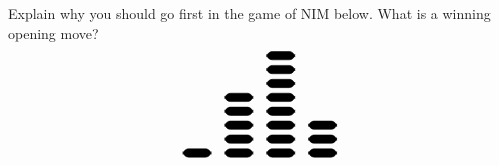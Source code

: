 \documentclass[12pt,letterpaper]{exam}
\begin{document}
\begin{questions}
\newpage
\question[10] Explain why you should go first in the game of NIM below. What is a winning opening move?
	\[
	\begin{tikzpicture}[scale=0.7]
	\draw[rounded corners,fill=black] (0,0) rectangle (1,0.3);
	\draw[rounded corners,fill=black] (1.5,0) rectangle (2.5,0.3);
	\draw[rounded corners,fill=black] (1.5,0.5) rectangle (2.5,0.8);
	\draw[rounded corners,fill=black] (1.5,1) rectangle (2.5,1.3);
	\draw[rounded corners,fill=black] (1.5,1.5) rectangle (2.5,1.8);
	\draw[rounded corners,fill=black] (1.5,2) rectangle (2.5,2.3);
	\draw[rounded corners,fill=black] (3,0) rectangle (4,0.3);
	\draw[rounded corners,fill=black] (3,0.5) rectangle (4,0.8);
	\draw[rounded corners,fill=black] (3,1) rectangle (4,1.3);	
	\draw[rounded corners,fill=black] (3,1.5) rectangle (4,1.8);	
	\draw[rounded corners,fill=black] (3,2) rectangle (4,2.3);	
	\draw[rounded corners,fill=black] (3,2.5) rectangle (4,2.8);	
	\draw[rounded corners,fill=black] (3,3) rectangle (4,3.3);	
	\draw[rounded corners,fill=black] (3,3.5) rectangle (4,3.8);	
	\draw[rounded corners,fill=black] (4.5,0) rectangle (5.5,0.3);
	\draw[rounded corners,fill=black] (4.5,0.5) rectangle (5.5,0.8);
	\draw[rounded corners,fill=black] (4.5,1) rectangle (5.5,1.3);	
	\end{tikzpicture}
	\] \pspace


\end{questions}
\end{document}
